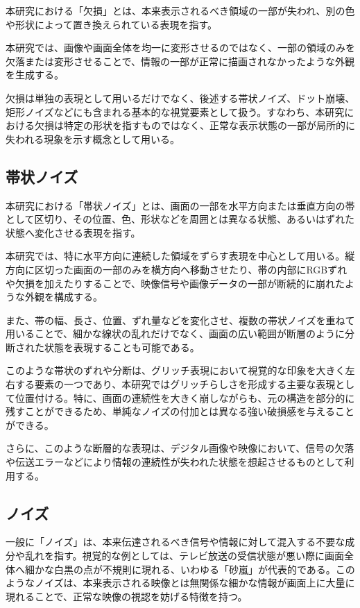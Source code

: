本研究における「欠損」とは、本来表示されるべき領域の一部が失われ、別の色や形状によって置き換えられている表現を指す。

本研究では、画像や画面全体を均一に変形させるのではなく、一部の領域のみを欠落または変形させることで、情報の一部が正常に描画されなかったような外観を生成する。

欠損は単独の表現として用いるだけでなく、後述する帯状ノイズ、ドット崩壊、矩形ノイズなどにも含まれる基本的な視覚要素として扱う。すなわち、本研究における欠損は特定の形状を指すものではなく、正常な表示状態の一部が局所的に失われる現象を示す概念として用いる。


\subsection{帯状ノイズ}

本研究における「帯状ノイズ」とは、画面の一部を水平方向または垂直方向の帯として区切り、その位置、色、形状などを周囲とは異なる状態、あるいはずれた状態へ変化させる表現を指す。

本研究では、特に水平方向に連続した領域をずらす表現を中心として用いる。縦方向に区切った画面の一部のみを横方向へ移動させたり、帯の内部にRGBずれや欠損を加えたりすることで、映像信号や画像データの一部が断続的に崩れたような外観を構成する。

また、帯の幅、長さ、位置、ずれ量などを変化させ、複数の帯状ノイズを重ねて用いることで、細かな線状の乱れだけでなく、画面の広い範囲が断層のように分断された状態を表現することも可能である。

このような帯状のずれや分断は、グリッチ表現において視覚的な印象を大きく左右する要素の一つであり、本研究ではグリッチらしさを形成する主要な表現として位置付ける。特に、画面の連続性を大きく崩しながらも、元の構造を部分的に残すことができるため、単純なノイズの付加とは異なる強い破損感を与えることができる。

さらに、このような断層的な表現は、デジタル画像や映像において、信号の欠落や伝送エラーなどにより情報の連続性が失われた状態を想起させるものとして利用する。


\subsection{ノイズ}

一般に「ノイズ」は、本来伝達されるべき信号や情報に対して混入する不要な成分や乱れを指す。視覚的な例としては、テレビ放送の受信状態が悪い際に画面全体へ細かな白黒の点が不規則に現れる、いわゆる「砂嵐」が代表的である。このようなノイズは、本来表示される映像とは無関係な細かな情報が画面上に大量に現れることで、正常な映像の視認を妨げる特徴を持つ。

